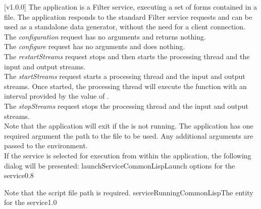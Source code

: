 [v1.0.0]
The  application is a Filter service, executing a set
of \CL{} forms contained in a file.
The application responds to the standard Filter service requests and can be used as a
standalone data generator, without the need for a client connection.\\

The \emph{configuration} request has no arguments and returns nothing.\\

The \emph{configure} request has no arguments and does nothing.\\

The \emph{restartStreams} request stops and then starts the processing thread and the
input and output streams.\\

The \emph{startStreams} request starts a processing thread and the input and output
streams.
Once started, the processing thread will execute the  function with
an interval provided by the value of .\\

The \emph{stopStreams} request stops the processing thread and the input and output
streams.\\ 

Note that the application will exit if the \emph{\RS} is not running.
The application has one required argument \longDash{} the path to the \CL{} file to be
used.
Any additional arguments are passed to the \CL{} environment.
\insertAppParameters
\insertTagDescription{\CLF}
\insertFilterServiceComment\\

\insertStandardServiceCommands
\secondaryEnd
\condPage
{}
If the service is selected for execution from within the \emph{\MMMU} application, the
following dialog will be presented:
%
{launchServiceCommonLisp}{Launch options for the \emph{\CLF} service}{0.8}

Note that the script file path is required.
%
{serviceRunningCommonLisp}{The \emph{\MMMU} entity for the \emph{\CLF} service}{1.0}

